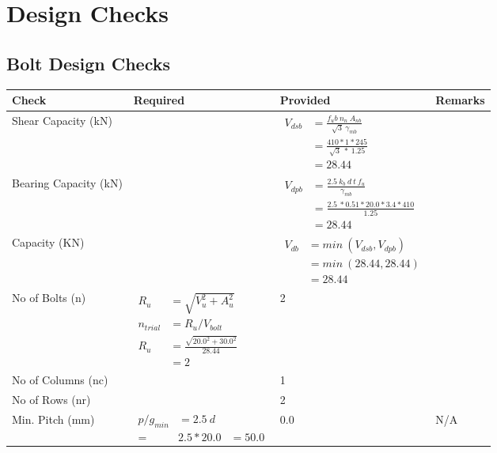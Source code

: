 \documentclass{article}%
\begin{document}
%
%
\section{Design Checks}%
\label{sec:DesignChecks}%
\subsection{Bolt Design Checks}%
\label{subsec:BoltDesignChecks}%
\renewcommand{\arraystretch}{1.2}%
\begin{longtable}{|p{4cm}|p{5cm}|p{5.5cm}|p{1.5cm}|}%
\hline%
\rowcolor{OsdagGreen}%
Check&Required&Provided&Remarks\\%
\hline%
\endhead%
\hline%
Shear Capacity (kN)&&$\begin{aligned}V_{dsb} &= \frac{f_ub ~n_n~ A_{nb}}{\sqrt{3} ~\gamma_{mb}}\\ &= \frac{410*1*245}{\sqrt{3}~*~1.25}\\ &= 28.44\end{aligned}$&\\%
\hline%
Bearing Capacity (kN)&&$\begin{aligned}V_{dpb} &= \frac{2.5~ k_b~ d~ t~ f_u}{\gamma_{mb}}\\ &= \frac{2.5~*0.51*20.0*3.4*410}{1.25}\\ &=28.44\end{aligned}$&\\%
\hline%
Capacity (KN)&&$\begin{aligned}V_{db} &= min~ (V_{dsb}, V_{dpb})\\ &= min~ (28.44,28.44)\\ &=28.44\end{aligned}$&\\%
\hline%
No of Bolts (n)&$\begin{aligned}R_{u} &= \sqrt{V_u^2+A_u^2}\\ n_{trial} &= R_u/ V_{bolt}\\ R_{u} &= \frac{\sqrt{20.0^2+30.0^2}}{28.44}\\ &=2\end{aligned}$&2&\\%
\hline%
No of Columns (nc)&&1&\\%
\hline%
No of Rows (nr)&&2&\\%
\hline%
Min. Pitch (mm)&$\begin{aligned}p/g_{min}&= 2.5 ~ d&\\ =&2.5*20.0&=50.0\end{aligned}$&0.0&N/A\\%

\end{longtable}
\end{document}
